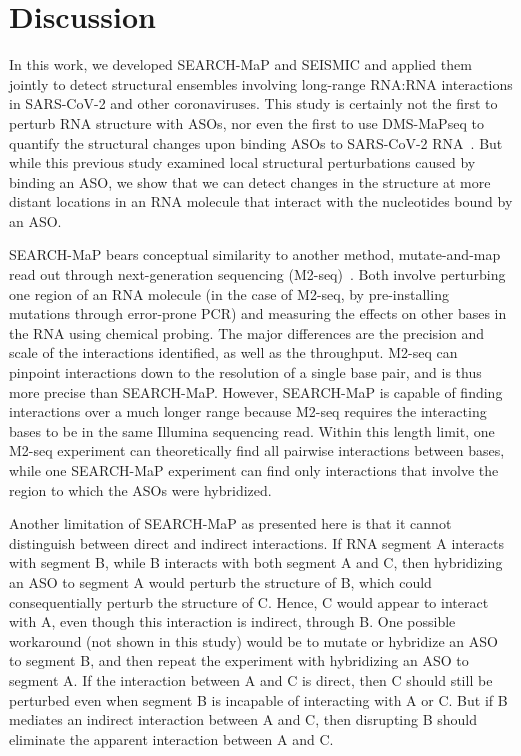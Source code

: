 \documentclass[main.tex]{subfiles}
\begin{document}
\section{Discussion}
\label{discussion}

In this work, we developed SEARCH-MaP and SEISMIC and applied them jointly to detect structural ensembles involving long-range RNA:RNA interactions in SARS-CoV-2 and other coronaviruses. This study is certainly not the first to perturb RNA structure with ASOs, nor even the first to use DMS-MaPseq to quantify the structural changes upon binding ASOs to SARS-CoV-2 RNA~\cite{Zhu2022}. But while this previous study examined local structural perturbations caused by binding an ASO, we show that we can detect changes in the structure at more distant locations in an RNA molecule that interact with the nucleotides bound by an ASO.

SEARCH-MaP bears conceptual similarity to another method, mutate-and-map read out through next-generation sequencing (M2-seq)~\cite{Cheng2017}. Both involve perturbing one region of an RNA molecule (in the case of M2-seq, by pre-installing mutations through error-prone PCR) and measuring the effects on other bases in the RNA using chemical probing. The major differences are the precision and scale of the interactions identified, as well as the throughput. M2-seq can pinpoint interactions down to the resolution of a single base pair, and is thus more precise than SEARCH-MaP. However, SEARCH-MaP is capable of finding interactions over a much longer range because M2-seq requires the interacting bases to be in the same Illumina sequencing read. Within this length limit, one M2-seq experiment can theoretically find all pairwise interactions between bases, while one SEARCH-MaP experiment can find only interactions that involve the region to which the ASOs were hybridized.

Another limitation of SEARCH-MaP as presented here is that it cannot distinguish between direct and indirect interactions. If RNA segment A interacts with segment B, while B interacts with both segment A and C, then hybridizing an ASO to segment A would perturb the structure of B, which could consequentially perturb the structure of C. Hence, C would appear to interact with A, even though this interaction is indirect, through B. One possible workaround (not shown in this study) would be to mutate or hybridize an ASO to segment B, and then repeat the experiment with hybridizing an ASO to segment A. If the interaction between A and C is direct, then C should still be perturbed even when segment B is incapable of interacting with A or C. But if B mediates an indirect interaction between A and C, then disrupting B should eliminate the apparent interaction between A and C.
\end{document}
